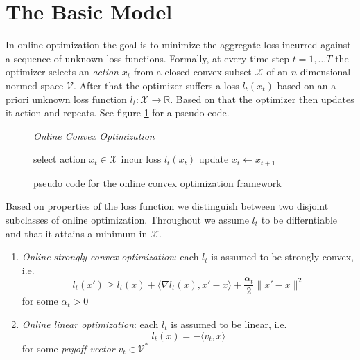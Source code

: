 \section{The Basic Model}\label{section:theBasicModel}

In online optimization the goal is to minimize the aggregate loss incurred against a sequence of unknown loss functions. Formally, at every time step $t = 1, \dots T$ the optimizer selects an \textit{action} $x_t$ from a closed convex subset $\mathcal{X}$ of an $n$-dimensional normed space $\mathcal{V}$. After that the optimizer suffers a loss $l_t(x_t)$ based on an a priori unknown loss function $l_t:\mathcal{X} \to \mathbb{R}$. Based on that the optimizer then updates it action and repeats. See figure \ref{fig:OCO} for a pseudo code.\\

\begin{figure}[H]\centering
    \textit{Online Convex Optimization}
    \begin{minipage}{.9\linewidth}
        \begin{algorithm}[H]
        \DontPrintSemicolon
         {
        select action $x_t \in \mathcal{X}$ \;
        incur loss $l_t(x_t)$ \;
        update $x_t \gets x_{t+1}$ \;
        }
        \end{algorithm}\caption{pseudo code for the online convex optimization framework}  \label{fig:OCO}
  \end{minipage}
\end{figure}

Based on properties of the loss function we distinguish between two disjoint subclasses of online optimization. Throughout we assume $l_t$ to be differntiable and that it attains a minimum in $\mathcal{X}$.

\begin{enumerate}
    \item\label{item:stronglyOptimization} \textit{Online strongly convex optimization}: each $l_t$ is assumed to be strongly convex, i.e.
    \begin{equation}\label{equ:stronglyOptimization}
        l_t(x') \ge l_t(x) + \langle \nabla l_t(x),x'-x\rangle + \frac{\alpha_t}{2}\|x'-x\|^2
    \end{equation}
    for some $\alpha_t > 0$
    \item \textit{Online linear optimization}: each $l_t$ is assumed to be linear, i.e. 
    \begin{equation}\label{equ:linaerOptimization}
        l_t(x) = -\langle v_t,x\rangle
    \end{equation}
    for some \textit{payoff vector} $v_t \in \mathcal{V}^*$
\end{enumerate}

